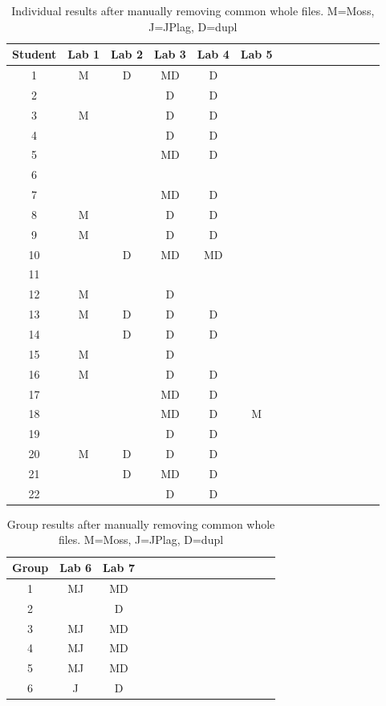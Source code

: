 \documentclass[10pt,journal,compsoc]{IEEEtran}
\begin{document}
		\begin{table}[h!]
			\begin{center}
				\caption{Individual results after manually removing common whole files. M=Moss, J=JPlag, D=dupl}
				\label{tab:newResults}
				\begin{tabular}{ccccccccccccccc}
					\toprule
					Student & Lab 1 & Lab 2 & Lab 3 & Lab 4 & Lab 5\\
					\midrule
					1 & M & D & MD & D & \\
					2 &  &  & D & D & \\
					3 & M &  & D & D & \\
					4 &  &  & D & D & \\
					5 &  &  & MD & D & \\
					6 &  &  &  &  & \\
					7 &  &  & MD & D & \\
					8 & M &  & D & D & \\
					9 & M &  & D & D & \\
					10 &  & D & MD & MD & \\
					11 &  &  &  &  & \\
					12 & M &  & D &  & \\
					13 & M & D & D & D & \\
					14 &  & D & D & D & \\
					15 & M &  & D &  & \\
					16 & M &  & D & D & \\
					17 &  &  & MD & D & \\
					18 &  &  & MD & D & M\\
					19 &  &  & D & D & \\
					20 & M & D & D & D & \\
					21 &  & D & MD & D & \\
					22 &  &  & D & D & \\
					\bottomrule
				\end{tabular}
			\end{center}
		\end{table}
		
		\begin{table}[h!]
			\begin{center}
				\caption{Group results after manually removing common whole files. M=Moss, J=JPlag, D=dupl}
				\label{tab:newResults2}
				\begin{tabular}{ccccccccccccccc}
					\toprule
					Group & Lab 6 & Lab 7\\
					\midrule
					1 & MJ & MD\\
					2 &  & D\\
					3 & MJ & MD\\
					4 & MJ & MD\\
					5 & MJ & MD\\
					6 & J & D\\
					\bottomrule
				\end{tabular}
			\end{center}
		\end{table}
	
\end{document}

